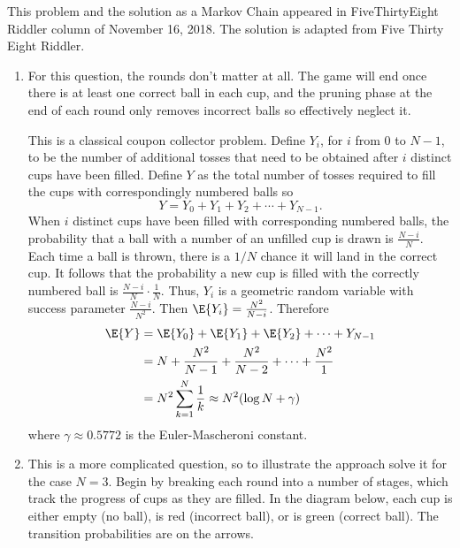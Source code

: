 \documentclass[12pt]{article}
\begin{document}
\begin{solution}
    \begin{remark}
        This problem and the solution as a Markov Chain appeared in
        {FiveThirtyEight} Riddler column of November 16, 2018.  The
        solution is adapted from 
        {Five Thirty Eight Riddler}.
    \end{remark}

    \begin{enumerate}[label=(\alph*)]
    \item
        For this question, the rounds don’t matter at all.  The game
        will end once there is at least one correct ball in each cup,
        and the pruning phase at the end of each round only removes
        incorrect balls so effectively neglect it.

        This is a classical coupon collector problem.  Define \( Y_i \),
        for \( i \) from \( 0 \) to \( N - 1 \), to be the number of additional
        tosses that need to be obtained after \( i \) distinct cups have
        been filled.  Define \( Y \) as the total number of tosses
        required to fill the cups with correspondingly numbered balls so
        \[
            Y = Y_0 + Y_1 + Y_2 + \cdots + Y_{N-1}.
        \] When \( i \) distinct cups have been filled with
        corresponding numbered balls, the probability that a ball with a
        number of an unfilled cup is drawn is \( \frac{N-i}{N} \).  Each
        time a ball is thrown, there is a \( 1/N \) chance it will land
        in the correct cup.  It follows that the probability a new cup
        is filled with the correctly numbered ball is \( \frac{N-i}{N}
        \cdot \frac{1}{N} \).  Thus, \( Y_i \) is a geometric random
        variable with success parameter \( \frac{N-i}{N^2} \). Then \(
        \E{Y_i} = \frac{N^2}{N-i} \).  Therefore
        \begin{align*}
            \E{Y} &= \E{Y_0} + \E{Y_1} + \E{Y_2} + \cdots + Y_{N-1} \\
            &= N + \frac{N^2}{N-1} + \frac{N^2}{N-2} + \cdots + \frac{N^2}
            {1} \\
            &= N^2 \sum_{k=1}^N \frac{1}{k} \approx N^2(\log N + \gamma)
        \end{align*}
        where \( \gamma \approx 0.5772 \) is the Euler-Mascheroni
        constant.
    \item
        This is a more complicated question, so to illustrate the
        approach solve it for the case \( N=3 \).  Begin by breaking
        each round into a number of stages, which track the progress of
        cups as they are filled.  In the diagram below, each
        cup is either empty (no ball), is red (incorrect ball), or is
        green (correct ball).  The transition probabilities are on the
        arrows.


\end{enumerate}
\end{solution}
\end{document}
